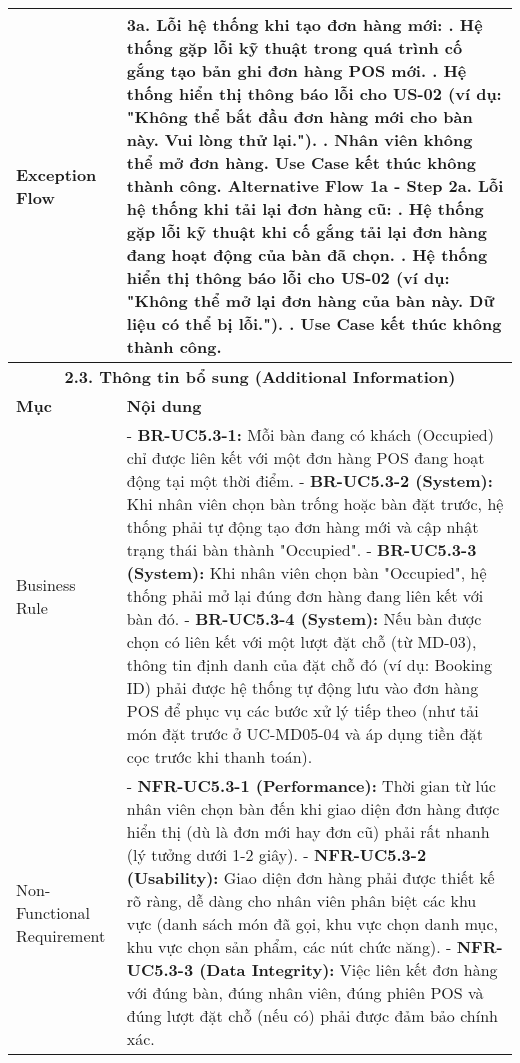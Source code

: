 \begin{longtable}{|m{4cm}|p{11cm}|}
Exception Flow & \textbf{3a. Lỗi hệ thống khi tạo đơn hàng mới:} \newline    1. Hệ thống gặp lỗi kỹ thuật trong quá trình cố gắng tạo bản ghi đơn hàng POS mới. \newline    2. Hệ thống hiển thị thông báo lỗi cho US-02 (ví dụ: "Không thể bắt đầu đơn hàng mới cho bàn này. Vui lòng thử lại."). \newline    3. Nhân viên không thể mở đơn hàng. Use Case kết thúc không thành công. \newline \textbf{Alternative Flow 1a - Step 2a. Lỗi hệ thống khi tải lại đơn hàng cũ:} \newline    1. Hệ thống gặp lỗi kỹ thuật khi cố gắng tải lại đơn hàng đang hoạt động của bàn đã chọn. \newline    2. Hệ thống hiển thị thông báo lỗi cho US-02 (ví dụ: "Không thể mở lại đơn hàng của bàn này. Dữ liệu có thể bị lỗi."). \newline    3. Use Case kết thúc không thành công. \\
\hline
\multicolumn{2}{|c|}{\textbf{2.3. Thông tin bổ sung (Additional Information)}} \\
\hline
\textbf{Mục} & \textbf{Nội dung} \\
\hline
Business Rule & - \textbf{BR-UC5.3-1:} Mỗi bàn đang có khách (Occupied) chỉ được liên kết với một đơn hàng POS đang hoạt động tại một thời điểm. \newline - \textbf{BR-UC5.3-2 (System):} Khi nhân viên chọn bàn trống hoặc bàn đặt trước, hệ thống phải tự động tạo đơn hàng mới và cập nhật trạng thái bàn thành "Occupied". \newline - \textbf{BR-UC5.3-3 (System):} Khi nhân viên chọn bàn "Occupied", hệ thống phải mở lại đúng đơn hàng đang liên kết với bàn đó. \newline - \textbf{BR-UC5.3-4 (System):} Nếu bàn được chọn có liên kết với một lượt đặt chỗ (từ MD-03), thông tin định danh của đặt chỗ đó (ví dụ: Booking ID) phải được hệ thống tự động lưu vào đơn hàng POS để phục vụ các bước xử lý tiếp theo (như tải món đặt trước ở UC-MD05-04 và áp dụng tiền đặt cọc trước khi thanh toán). \\
\hline
Non-Functional Requirement & - \textbf{NFR-UC5.3-1 (Performance):} Thời gian từ lúc nhân viên chọn bàn đến khi giao diện đơn hàng được hiển thị (dù là đơn mới hay đơn cũ) phải rất nhanh (lý tưởng dưới 1-2 giây). \newline - \textbf{NFR-UC5.3-2 (Usability):} Giao diện đơn hàng phải được thiết kế rõ ràng, dễ dàng cho nhân viên phân biệt các khu vực (danh sách món đã gọi, khu vực chọn danh mục, khu vực chọn sản phẩm, các nút chức năng). \newline - \textbf{NFR-UC5.3-3 (Data Integrity):} Việc liên kết đơn hàng với đúng bàn, đúng nhân viên, đúng phiên POS và đúng lượt đặt chỗ (nếu có) phải được đảm bảo chính xác. \\
\hline
\end{longtable}

